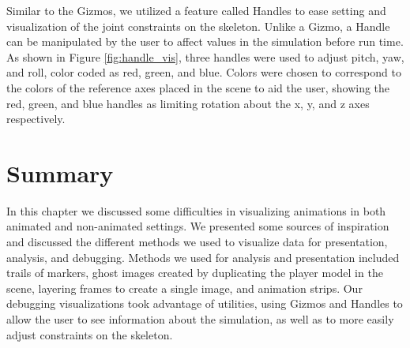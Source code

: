 Similar to the Gizmos, we utilized a feature called Handles to ease setting and visualization of the joint constraints on the skeleton.  Unlike a Gizmo, a Handle can be manipulated by the user to affect values in the simulation before run time.  As shown in Figure \ref{fig:handle_vis}, three handles were used to adjust pitch, yaw, and roll, color coded as red, green, and blue.  Colors were chosen to correspond to the colors of the reference axes placed in the scene to aid the user, showing the red, green, and blue handles as limiting rotation about the x, y, and z axes respectively.

\section{Summary}
In this chapter we discussed some difficulties in visualizing animations in both animated and non-animated settings.  We presented some sources of inspiration and discussed the different methods we used to visualize data for presentation, analysis, and debugging.  Methods we used for analysis and presentation included trails of markers, ghost images created by duplicating the player model in the scene, layering frames to create a single image, and animation strips.  Our debugging visualizations took advantage of \unity{} utilities, using Gizmos and Handles to allow the user to see information about the simulation, as well as to more easily adjust constraints on the skeleton.
\label{section:vis_summary}
